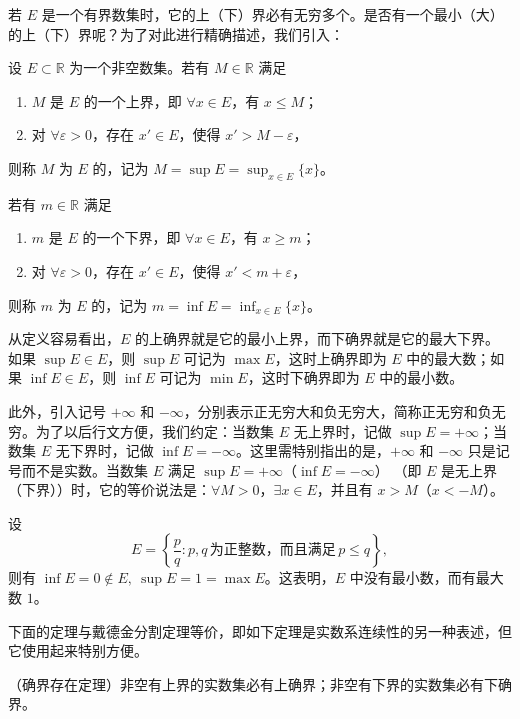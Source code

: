 \documentclass[UTF8,12pt,a4paper,fontset=fandol]{ctexbook}
\begin{document}
若 $E$ 是一个有界数集时，它的上（下）界必有无穷多个。是否有一个最小（大）的上（下）界呢？为了对此进行精确描述，我们引入：


\begin{definition}
设 $E\subset\mathbb{R}$ 为一个非空数集。若有 $M\in\mathbb{R}$ 满足
\begin{enumerate}[label=(\arabic*)]
  \item $M$ 是 $E$ 的一个上界，即 $\forall x\in E$，有 $x\le M$；
  \item 对 $\forall\varepsilon>0$，存在 $x'\in E$，使得 $x'>M-\varepsilon$，
\end{enumerate}
则称 $M$ 为 $E$ 的，记为 $M=\sup E=\sup_{x\in E}\{x\}$。


若有 $m\in\mathbb{R}$ 满足
\begin{enumerate}[label=(\arabic*)]
  \item $m$ 是 $E$ 的一个下界，即 $\forall x\in E$，有 $x\ge m$；
  \item 对 $\forall\varepsilon>0$，存在 $x'\in E$，使得 $x'<m+\varepsilon$，
\end{enumerate}
则称 $m$ 为 $E$ 的，记为 $m=\inf E=\inf_{x\in E}\{x\}$。
\end{definition}

从定义容易看出，$E$ 的上确界就是它的最小上界，而下确界就是它的最大下界。如果 $\sup E\in E$，则 $\sup E$ 可记为 $\max E$，这时上确界即为 $E$ 中的最大数；如果 $\inf E\in E$，则 $\inf E$ 可记为 $\min E$，这时下确界即为 $E$ 中的最小数。


此外，引入记号 $+\infty$ 和 $-\infty$，分别表示正无穷大和负无穷大，简称正无穷和负无穷。为了以后行文方便，我们约定：当数集 $E$ 无上界时，记做 $\sup E=+\infty$；当数集 $E$ 无下界时，记做 $\inf E=-\infty$。这里需特别指出的是，$+\infty$ 和 $-\infty$ 只是记号而不是实数。当数集 $E$ 满足 $\sup E=+\infty$（$\inf E=-\infty$） （即 $E$ 是无上界（下界））时，它的等价说法是：$\forall M>0$，$\exists x\in E$，并且有 $x>M$（$x<-M$）。


\begin{example}
设
\[
  E=\left\{\frac pq:p,q\,\text{为正整数，而且满足}\,p\leqslant q\right\},
\]
则有 $\inf E=0\notin E,\ \sup E=1=\max E$。这表明，$E$ 中没有最小数，而有最大数 $1$。
\end{example}


下面的定理与戴德金分割定理等价，即如下定理是实数系连续性的另一种表述，但它使用起来特别方便。


\begin{theorem}
  （确界存在定理）非空有上界的实数集必有上确界；非空有下界的实数集必有下确界。
\end{theorem}
\end{document}
